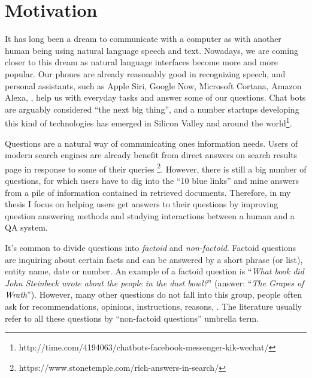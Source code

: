 %
%
\label{chapter:intro}

\setcounter{page}{1}
\pagestyle{myheadings}


\newtheorem{definition}{Definition}
\newtheorem{proposition}{Proposition}


\section{Motivation}

It has long been a dream to communicate with a computer as with another human being using natural language speech and text.
Nowadays, we are coming closer to this dream as natural language interfaces become more and more popular.
Our phones are already reasonably good in recognizing speech, and personal assistants, such as Apple Siri, Google Now, Microsoft Cortana, Amazon Alexa, \etc, help us with everyday tasks and answer some of our questions.
Chat bots are arguably considered ``the next big thing'', and a number startups developing this kind of technologies has emerged in Silicon Valley and around the world\footnote{http://time.com/4194063/chatbots-facebook-messenger-kik-wechat/}.

Questions are a natural way of communicating ones information needs.
Users of modern search engines are already benefit from direct answers on search results page in response to some of their queries \footnote{https://www.stonetemple.com/rich-answers-in-search/}.
However, there is still a big number of questions, for which users have to dig into the ``10 blue links'' and mine answers from a pile of information contained in retrieved documents.
Therefore, in my thesis I focus on helping users get answers to their questions by improving question answering methods and studying interactions between a human and a QA system.

It's common to divide questions into \textit{factoid} and \textit{non-factoid}.
Factoid questions are inquiring about certain facts and can be answered by a short phrase (or list), \ie entity name, date or number.
An example of a factoid question is ``\textit{What book did John Steinbeck wrote about the people in the dust bowl?}'' (answer: ``\textit{The Grapes of Wrath}'').
However, many other questions do not fall into this group, \ie people often ask for recommendations, opinions, instructions, reasons, \etc.
The literature usually refer to all these questions by ``non-factoid questions'' umbrella term.

